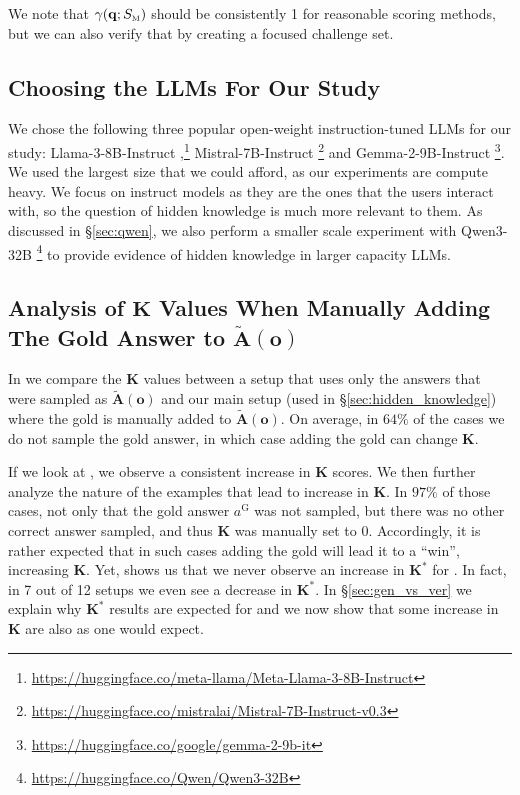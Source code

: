 We note that $\gamma(\mathbf{q}; S_{\text{\tiny M}})$ should be consistently 1 for reasonable scoring methods, but we can also verify that by creating a focused challenge set.



\subsection{Choosing the LLMs For Our Study}
\label{sec:llms}

We chose the following three popular open-weight instruction-tuned LLMs for our study: \textsf{Llama-3-8B-Instruct} \citep{dubey2024llama},\footnote{\scriptsize \url{https://huggingface.co/meta-llama/Meta-Llama-3-8B-Instruct}}
\textsf{Mistral-7B-Instruct} \citep{jiang2023mistral}\footnote{\scriptsize \url{https://huggingface.co/mistralai/Mistral-7B-Instruct-v0.3}} and \textsf{Gemma-2-9B-Instruct} \citep{team2024gemma}\footnote{\scriptsize \url{https://huggingface.co/google/gemma-2-9b-it}}.
We used the largest size that we could afford, as our experiments are compute heavy. We focus on instruct models as they are the ones that the users interact with, so the question of hidden knowledge is much more relevant to them. As 
discussed in \S \ref{sec:qwen}, we also perform a smaller scale experiment with \textsf{Qwen3-32B} \citep{yang2025qwen3}\footnote{\scriptsize \url{https://huggingface.co/Qwen/Qwen3-32B}} to provide evidence of hidden knowledge in larger capacity LLMs.





\subsection{Analysis of \texorpdfstring{$\mathbf{K}$}{K} Values When Manually Adding The Gold Answer to \texorpdfstring{$\mathbf{\tilde{A}(o)}$}{A(o)}}
\label{sec:force_gold_k}

In  we compare the $\mathbf{K}$ values between a setup that uses only the answers that were sampled as $\mathbf{\tilde{A}(o)}$ and our main setup (used in \S \ref{sec:hidden_knowledge}) where the gold is manually added to $\mathbf{\tilde{A}(o)}$. 
On average, in $64\%$ of the cases we do not sample the gold answer, in which case adding the gold can change $\mathbf{K}$. 

If we look at \baselineA, we observe a consistent increase in $\mathbf{K}$ scores. 
We then further analyze the nature of the examples that lead to increase in $\mathbf{K}$. In $97\%$ of those cases, not only that the gold answer $a^\text{G}$ was not sampled, but there was no other correct answer sampled, and thus $\mathbf{K}$ was manually set to $0$. Accordingly, it is rather expected that in such cases adding the gold will lead it to a ``win'', increasing $\mathbf{K}$. Yet,  shows us that we never observe an increase in $\mathbf{K^\ast}$ for \baselineA. In fact, in 7 out of 12 setups we even see a decrease in $\mathbf{K^\ast}$. In \S \ref{sec:gen_vs_ver} we explain why $\mathbf{K^\ast}$ results are expected for \baselineA and we now show that some increase in $\mathbf{K}$ are also as one would expect.



